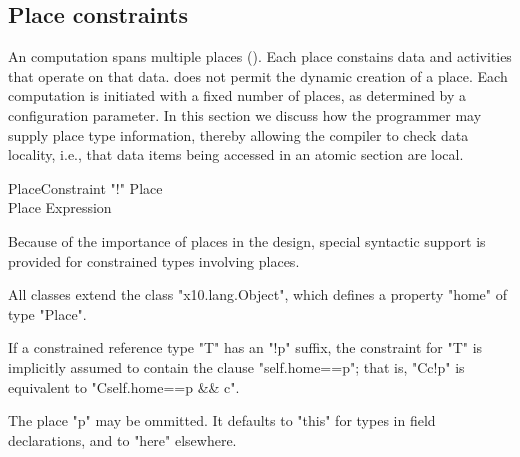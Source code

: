 \subsection{Place constraints}
\label{PlaceTypes}
\label{PlaceType}
\label{DepType:PlaceType}

An \Xten{} computation spans multiple places
(). Each place constains data and activities that
operate on that data.  \XtenCurrVer{} does not permit the dynamic
creation of a place. Each \Xten{} computation is initiated with a
fixed number of places, as determined by a configuration parameter.
In this section we discuss how the programmer may supply place type
information, thereby allowing the compiler to check data locality,
i.e., that data items being accessed in an atomic section are local.

\begin{grammar}
PlaceConstraint     \: \xcd"!" Place\opt \\
Place              \:   Expression \\
\end{grammar}

Because of the importance of places in the \Xten{} design, special
syntactic support is provided for constrained types involving places.

All \Xten{} classes extend the class
\xcd"x10.lang.Object", which defines a property
\xcd"home" of type
\xcd"Place".

If a constrained reference type \xcd"T" has an \xcd"!p" suffix,
the constraint for \xcd"T" is implicitly assumed to contain the clause
\xcd"self.home==p"; that is,
\xcd"C{c}!p" is equivalent to \xcd"C{self.home==p && c}".

The place \xcd"p" may be ommitted. It defaults to \xcd"this" 
for types in field declarations, and to \xcd"here" elsewhere.





